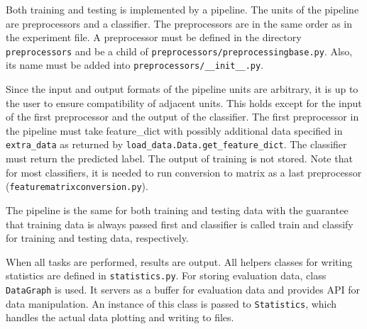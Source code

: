 Both training and testing is implemented by a pipeline.
The units of the pipeline are preprocessors and a classifier.
The preprocessors are in the same order as in the experiment file.
A preprocessor must be defined in the directory \texttt{preprocessors} and be a child of \texttt{preprocessors/preprocessingbase.py}.
Also, its name must be added into \texttt{preprocessors/\_\_init\_\_.py}.

Since the input and output formats of the pipeline units are arbitrary,
it is up to the user to ensure compatibility of adjacent units.
This holds except for the input of the first preprocessor and the output of the classifier.
The first preprocessor in the pipeline must take feature\_dict with possibly additional data specified in \texttt{extra\_data} as returned by \texttt{load\_data.Data.get\_feature\_dict}.
The classifier must return the predicted label.
The output of training is not stored.
Note that for most classifiers, it is needed to run conversion to matrix as a last preprocessor (\texttt{featurematrixconversion.py}).

The pipeline is the same for both training and testing data with the guarantee that
training data is always passed first and classifier is called train and classify for
training and testing data, respectively.

When all tasks are performed, results are output.
All helpers classes for writing statistics are defined in \texttt{statistics.py}.
For storing evaluation data, class \texttt{DataGraph} is used.
It servers as a buffer for evaluation data and provides API for data manipulation.
An instance of this class is passed to \texttt{Statistics},
which handles the actual data plotting and writing to files.




